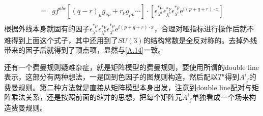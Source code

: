 \begin{example}
\begin{equation}
\begin{aligned}
			=&gf^{abc}\left[(q-r)_\mu g_{\nu\rho}+r_\nu g_{\rho\mu}\cdots\right]\cdot\left[\epsilon_{\lambda^a}^{*\mu}\epsilon_{\lambda^b}^{*\nu}\epsilon^{*\rho}_{\lambda^c}\mathrm{e}^{i(p+q+r)\cdot x}\right]\\
		\end{aligned}
	\end{equation}
	根据外线本身就固有的因子$\epsilon_{\lambda^a}^{*\mu}\epsilon_{\lambda^b}^{*\nu}\epsilon^{*\rho}_{\lambda^c}\mathrm{e}^{i(p+q+r)\cdot x}$，合理对哑指标进行操作后就不难得到上面这个式子，其中还用到了$SU(3)$的结构常数是全反对称的。去掉外线带来的因子后就得到了顶点项，显然与\ref{A.14}一致。
\end{example}

还有一个费曼规则疑难杂症，就是矩阵模型的费曼规则，要使用所谓的double line表示，这部分有两种想法，一是回到色因子的图规则构造，然后配以$T^a$得到${A^i}_j$的费曼规则。第二种方法就是直接从矩阵模型本身出发，注意到double line配对与矩阵乘法关系，还是按照前面的缩并的思想，把每个矩阵元${A^i}_j$单独看成一个场来构造费曼规则。